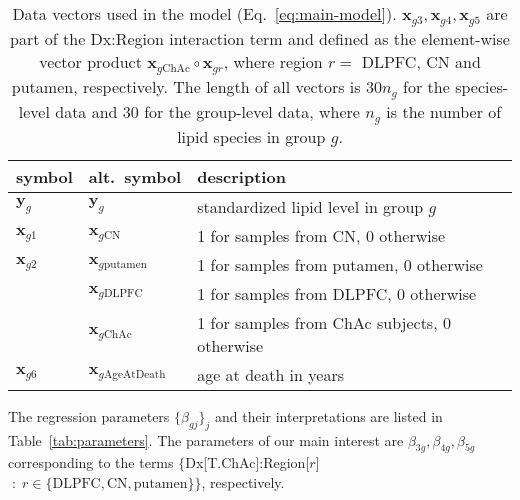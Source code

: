 \documentclass[letterpaper]{article}
\begin{document}
\begin{table}
\begin{tabular}[]{lll}
 \hline
 symbol            &  alt.~symbol                        & description \\
 \hline
 $\mathbf{y}_{g}$  & $\mathbf{y}_{g}$                    & standardized lipid level in group $g$ \\
 $\mathbf{x}_{g1}$ & $\mathbf{x}_{g\mathrm{CN}}$         & 1 for samples from CN, 0 otherwise \\
 $\mathbf{x}_{g2}$ & $\mathbf{x}_{g\mathrm{putamen}}$    & 1 for samples from putamen, 0 otherwise \\
                   & $\mathbf{x}_{g\mathrm{DLPFC}}$      & 1 for samples from DLPFC, 0 otherwise \\
                   & $\mathbf{x}_{g\mathrm{ChAc}}$       & 1 for samples from ChAc subjects, 0 otherwise \\
 $\mathbf{x}_{g6}$ & $\mathbf{x}_{g\mathrm{AgeAtDeath}}$ & age at death in years \\
 \hline
\end{tabular}
\caption{Data vectors used in the model (Eq.~\ref{eq:main-model}).
$\mathbf{x}_{g3}, \mathbf{x}_{g4}, \mathbf{x}_{g5}$ are part of the Dx:Region
interaction term and defined as the element-wise vector product $\mathbf{x}_{g\mathrm{ChAc}} \circ
\mathbf{x}_{gr}$, where region $r =$ DLPFC, CN and putamen,
respectively. The length of all vectors is $30 n_g$ for the species-level data
and $30$ for the group-level data, where $n_g$ is the number of lipid species
in group $g$.}
\label{tab:data-vectors}
\end{table}

The regression parameters $\{\beta_{gj}\}_j$ and their interpretations are
listed in Table~\ref{tab:parameters}.  The parameters of our main interest are
$\beta_{3g}, \beta_{4g}, \beta_{5g}$ corresponding to the terms
$\{$Dx[T.ChAc]:Region[$r$]$ \; : \; r \in \{\mathrm{DLPFC}, \mathrm{CN},
\mathrm{putamen}\}\}$, respectively.
\end{document}
